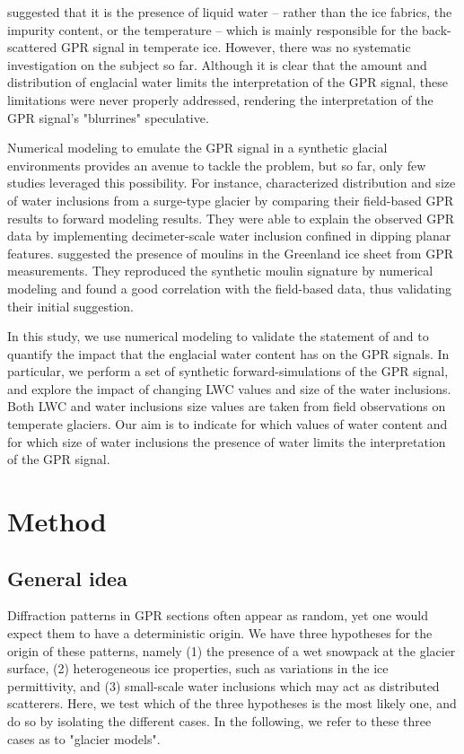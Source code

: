 \cite{Smith&Evans1972} suggested that it is the presence of liquid water -- rather than the ice fabrics, the impurity content, or the temperature -- which is mainly responsible for the back-scattered GPR signal in temperate ice. However, there was no systematic investigation on the subject so far. Although it is clear that the amount and distribution of englacial water limits the interpretation of the GPR signal, these limitations were never properly addressed, rendering the interpretation of the GPR signal's "blurrines" speculative. 

Numerical modeling to emulate the GPR signal in a synthetic glacial environments provides an avenue to tackle the problem, but so far, only few studies leveraged this possibility. For instance, \cite{Barrett&al2008} characterized distribution and size of water inclusions from a surge-type glacier by comparing their field-based GPR results to forward modeling results. They were able to explain the observed GPR data by implementing decimeter-scale water inclusion confined in dipping planar features. \cite{Catania&al2008} suggested the presence of moulins in the Greenland ice sheet from GPR measurements. They reproduced the synthetic moulin signature by numerical modeling and found a good correlation with the field-based data, thus validating their initial suggestion. 

 In this study, we use numerical modeling to validate the statement of \cite{Smith&Evans1972} and to quantify the impact that the englacial water content has on the GPR signals. In particular, we perform a set of synthetic forward-simulations of the GPR signal, and explore the impact of changing LWC values and size of the water inclusions. Both LWC and water inclusions size values are taken from field observations on temperate glaciers. Our aim is to indicate for which values of water content and for which size of water inclusions the presence of water limits the interpretation of the  GPR signal.

 \section{Method}
\label{sec:method}

\subsection{General idea}

Diffraction patterns in GPR sections often appear as random, yet one would expect them to have a deterministic origin. We have three hypotheses for the origin of these patterns, namely (1) the presence of a wet snowpack at the glacier surface, (2) heterogeneous ice properties, such as variations in the ice permittivity, and (3) small-scale water inclusions which may act as distributed scatterers. Here, we test which of the three hypotheses is the most likely one, and do so by isolating the different cases. In the following, we refer to these three cases as to "glacier models".


